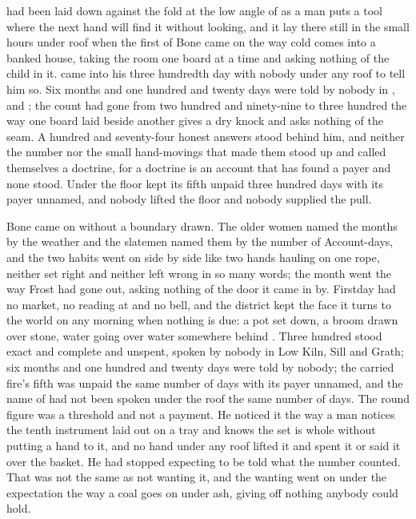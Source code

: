 
 had been laid down against the fold at the low angle of  as a man puts a tool where the next hand will find it without looking, and it lay there still in the small hours under  roof when the first of Bone came on the way cold comes into a banked house, taking the room one board at a time and asking nothing of the child in it.  came into his three hundredth day with nobody under any roof to tell him so. Six months and one hundred and twenty days were told by nobody in ,  and ; the count had gone from two hundred and ninety-nine to three hundred the way one board laid beside another gives a dry knock and asks nothing of the seam. A hundred and seventy-four honest answers stood behind him, and neither the number nor the small hand-movings that made them stood up and called themselves a doctrine, for a doctrine is an account that has found a payer and none stood. Under the floor  kept its fifth unpaid three hundred days with its payer unnamed, and nobody lifted the floor and nobody supplied the pull.

Bone came on without a boundary drawn. The older women named the months by the weather and the slatemen named them by the number of Account-days, and the two habits went on side by side like two hands hauling on one rope, neither set right and neither left wrong in so many words; the month went the way Frost had gone out, asking nothing of the door it came in by. Firstday had no market, no reading at  and no bell, and the district kept the face it turns to the world on any morning when nothing is due: a pot set down, a broom drawn over stone, water going over water somewhere behind . Three hundred stood exact and complete and unspent, spoken by nobody in Low Kiln, Sill and Grath; six months and one hundred and twenty days were told by nobody; the carried fire's fifth was unpaid the same number of days with its payer unnamed, and the name of  had not been spoken under the roof the same number of days. The round figure was a threshold and not a payment. He noticed it the way a man notices the tenth instrument laid out on a tray and knows the set is whole without putting a hand to it, and no hand under any roof lifted it and spent it or said it over the basket. He had stopped expecting to be told what the number counted. That was not the same as not wanting it, and the wanting went on under the expectation the way a coal goes on under ash, giving off nothing anybody could hold.

